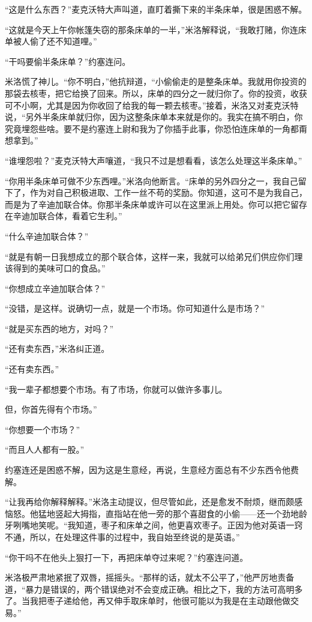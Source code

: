     “这是什么东西？”麦克沃特大声叫道，直盯着撕下来的半条床单，很是困惑不解。

    “这就是今天上午你帐篷失窃的那条床单的一半，”米洛解释说，“我敢打赌，你连床单被人偷了还不知道哩。”

    “干吗要偷半条床单？”约塞连问。

    米洛慌了神儿。“你不明白，”他抗辩道，“小偷偷走的是整条床单。我就用你投资的那袋去核枣，把它给换了回来。所以，床单的四分之一就归你了。你的投资，收获可不小啊，尤其是因为你收回了给我的每一颗去核枣。”接着，米洛又对麦克沃特说，“另外半条床单就归你，因为这整条床单本来就是你的。我实在搞不明白，你究竟埋怨些啥。要不是约塞连上尉和我为了你插手此事，你恐怕连床单的一角都甭想拿到。”

    “谁埋怨啦？”麦克沃特大声嚷道，“我只不过是想看看，该怎么处理这半条床单。”

    “你用半条床单可做不少东西哩。”米洛向他断言。“床单的另外四分之一，我自己留下了，作为对自己积极进取、工作一丝不苟的奖励。你知道，这可不是为我自己，而是为了辛迪加联合体。你那半条床单或许可以在这里派上用处。你可以把它留存在辛迪加联合体，看着它生利。”

    “什么辛迪加联合体？”

    “就是有朝一日我想成立的那个联合体，这样一来，我就可以给弟兄们供应你们理该得到的美味可口的食品。”

    “你想成立辛迪加联合体？”

    “没错，是这样。说确切一点，就是一个市场。你可知道什么是市场？”

    “就是买东西的地方，对吗？”

    “还有卖东西，”米洛纠正道。

    “还有卖东西。”

    “我一辈子都想要个市场。有了市场，你就可以做许多事儿。

    但，你首先得有个市场。”

    “你想要一个市场？”

    “而且人人都有一股。”

    约塞连还是困惑不解，因为这是生意经，再说，生意经方面总有不少东西令他费解。

    “让我再给你解释解释。”米洛主动提议，但尽管如此，还是愈发不耐烦，继而颇感恼怒。他猛地竖起大拇指，直指站在他一旁的那个喜甜食的小偷——还一个劲地龄牙咧嘴地笑呢。“我知道，枣子和床单之间，他更喜欢枣子。正因为他对英语一窍不通，所以，在处理这件事的过程中，我自始至终说的是英语。”

    “你干吗不在他头上狠打一下，再把床单夺过来呢？”约塞连问道。

    米洛极严肃地紧抿了双唇，摇摇头。“那样的话，就太不公平了，”他严厉地责备道，“暴力是错误的，两个错误绝对不会变成正确。相比之下，我的方法可高明多了。当我把枣子递给他，再又伸手取床单时，他很可能以为我是在主动跟他做交易。”

